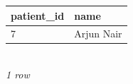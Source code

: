 {\scriptsize\setlength{\tabcolsep}{2.5pt}\begin{tabular}{ll}\toprule
\textbf{patient\_id} & \textbf{name} \\\midrule
7 & Arjun Nair \\
\bottomrule\end{tabular}}\\[-1pt]{\tiny\itshape 1 row}

